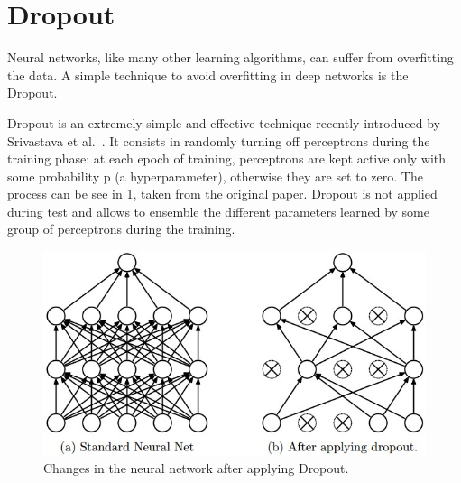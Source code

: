 \section{Dropout}
\label{sec:dropout}

Neural networks, like many other learning algorithms, can suffer from overfitting the data.
A simple technique to avoid overfitting in deep networks is the Dropout.

Dropout is an extremely simple and effective technique recently introduced by Srivastava et al.\ \cite{srivastava2014dropout}.
It consists in randomly turning off perceptrons during the training phase:
at each epoch of training, perceptrons are kept active only with some probability p (a hyperparameter), otherwise they are set to zero.
The process can be see in \cref{fig:dropout}, taken from the original paper.
Dropout is not applied during test and allows to ensemble the different parameters learned by some group of perceptrons during the training.

\begin{figure}[ht]
	\centering
	\includegraphics[width=\columnwidth]{figures/dropout}
	\caption{Changes in the neural network after applying Dropout.}
	\label{fig:dropout}
\end{figure}
